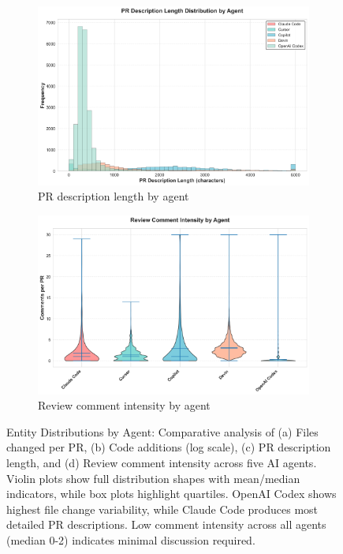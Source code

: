 \documentclass[11pt]{article}
\begin{document}
\begin{figure}[H]
\begin{subfigure}[b]{0.48\textwidth}
\centering
\includegraphics[width=\textwidth]{figures_individual/33_entity_pr_description_length_by_agent.png}
\caption{PR description length by agent}
\label{fig:entity_pr_desc}
\end{subfigure}
\hfill
\begin{subfigure}[b]{0.48\textwidth}
\centering
\includegraphics[width=\textwidth]{figures_individual/34_entity_review_comment_intensity_by_agent.png}
\caption{Review comment intensity by agent}
\label{fig:entity_comments}
\end{subfigure}


\caption{Entity Distributions by Agent: Comparative analysis of (a) Files changed per PR, (b) Code additions (log scale), (c) PR description length, and (d) Review comment intensity across five AI agents. Violin plots show full distribution shapes with mean/median indicators, while box plots highlight quartiles. OpenAI Codex shows highest file change variability, while Claude Code produces most detailed PR descriptions. Low comment intensity across all agents (median 0-2) indicates minimal discussion required.}
\label{fig:entity_dist_part1}
\end{figure}
\end{document}

